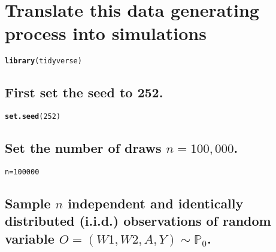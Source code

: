 \documentclass{article}\usepackage[]{graphicx}\usepackage[]{xcolor}
\makeatletter
\newcommand{\hlnum}[1]{\textcolor[rgb]{0.686,0.059,0.569}{#1}}%
\newcommand{\hlstd}[1]{\textcolor[rgb]{0.345,0.345,0.345}{#1}}%
\newcommand{\hlkwb}[1]{\textcolor[rgb]{0.69,0.353,0.396}{#1}}%
\newcommand{\hlkwd}[1]{\textcolor[rgb]{0.737,0.353,0.396}{\textbf{#1}}}%
\newenvironment{kframe}{%
 \def\at@end@of@kframe{}%
 \ifinner\ifhmode%
  \def\at@end@of@kframe{\end{minipage}}%
  \begin{minipage}{\columnwidth}%
 \fi\fi%
 \def\FrameCommand##1{\hskip\@totalleftmargin \hskip-\fboxsep
 \colorbox{shadecolor}{##1}\hskip-\fboxsep
     \hskip-\linewidth \hskip-\@totalleftmargin \hskip\columnwidth}%
 \MakeFramed {\advance\hsize-\width
   \@totalleftmargin\z@ \linewidth\hsize
   \@setminipage}}%
 {\par\unskip\endMakeFramed%
 \at@end@of@kframe}
\newenvironment{knitrout}{}{} %
\makeatother
\begin{document}
\newpage

\section{Translate this data generating process into simulations}

\begin{knitrout}
\color{fgcolor}\begin{kframe}
\begin{alltt}
\hlkwd{library}\hlstd{(tidyverse)}
\end{alltt}
\end{kframe}
\end{knitrout}


  \subsection{First set the seed to 252.}
  
\begin{knitrout}
\color{fgcolor}\begin{kframe}
\begin{alltt}
\hlkwd{set.seed}\hlstd{(}\hlnum{252}\hlstd{)}
\end{alltt}
\end{kframe}
\end{knitrout}
  
  \subsection{Set the number of draws $n = 100,000$.}
  
\begin{knitrout}
\color{fgcolor}\begin{kframe}
\begin{alltt}
\hlstd{n} \hlkwb{=} \hlnum{100000}
\end{alltt}
\end{kframe}
\end{knitrout}
  
  \subsection{Sample $n$ independent and identically distributed (i.i.d.) observations of random variable $O=(W1,W2,A,Y) \sim \mathbb{P}_0$.}
  
\end{document}
